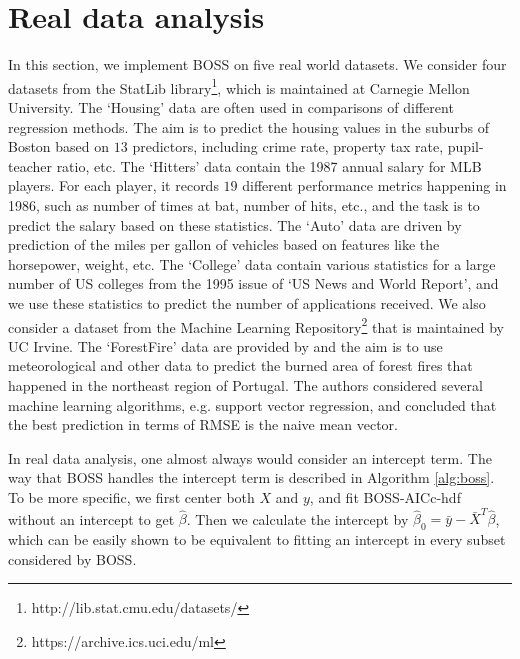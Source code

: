 \section{Real data analysis}
\label{sec:real_data}
In this section, we implement BOSS on five real world datasets. We consider four datasets from the StatLib library\footnote{http://lib.stat.cmu.edu/datasets/}, which is maintained at Carnegie Mellon University. The `Housing' data are often used in comparisons of different regression methods. The aim is to predict the housing values in the suburbs of Boston based on $13$ predictors, including crime rate, property tax rate, pupil-teacher ratio, etc. The `Hitters' data contain the 1987 annual salary for MLB players. For each player, it records $19$ different performance metrics happening in 1986, such as number of times at bat, number of hits, etc., and the task is to predict the salary based on these statistics. The `Auto' data are driven by prediction of the miles per gallon of vehicles based on features like the horsepower, weight, etc. The `College' data contain various statistics for a large number of US colleges from the 1995 issue of `US News and World Report', and we use these statistics to predict the number of applications received. We also consider a dataset from the Machine Learning Repository\footnote{https://archive.ics.uci.edu/ml} that is maintained by UC Irvine. The `ForestFire' data are provided by \citet{cortez2007data} and the aim is to use meteorological and other data to predict the burned area of forest fires that happened in the northeast region of Portugal. The authors considered several machine learning algorithms, e.g. support vector regression, and concluded that the best prediction in terms of RMSE is the naive mean vector.


In real data analysis, one almost always would consider an intercept term. The way that BOSS handles the intercept term is described in Algorithm \ref{alg:boss}. To be more specific, we first center both $X$ and $y$, and fit BOSS-AICc-hdf without an intercept to get $\hat{\beta}$. Then we calculate the intercept by $
\hat{\beta}_0=\bar{y} - \bar{X}^T \hat{\beta}$, which can be easily shown to be equivalent to fitting an intercept in every subset considered by BOSS. 

